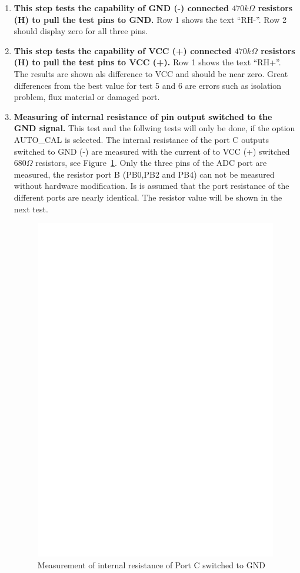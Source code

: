 \begin{enumerate}
\item {\bf This step tests the capability of GND (-) connected \(470k\Omega\) resistors (H) to pull the test pins to GND.}
Row 1 shows the text  ``RH-''.
Row 2 should display zero for all three pins.

\item {\bf This step tests the capability of VCC (+) connected \(470k\Omega\) resistors (H) to pull the test pins  to VCC (+).}
Row 1 shows the text ``RH+''.
The results are shown als difference to VCC and should be near zero.
 Great differences from the best value for test 5 and 6 are errors  such as isolation problem, flux material or damaged port.

\item {\bf Measuring of internal resistance of pin output switched to the GND signal.}
This test and the follwing tests will only be done, if the option AUTO\_CAL is selected.
The internal resistance of the port C outputs switched to GND (-) are measured with the current
of to VCC (+) switched \(680\Omega\) resistors, see Figure~\ref{fig:test7}.
Only the three pins of the ADC port are measured, the resistor port B (PB0,PB2 and PB4) can not be measured
without hardware modification.
Is is assumed that the port resistance of the different ports are nearly identical.
The resistor value will be shown in the next test.
\begin{figure}[H]
\centering
\includegraphics[]{../FIG/Test7.eps}
\caption{Measurement of internal resistance of Port C switched to GND }
\label{fig:test7}
\end{figure}


\end{enumerate}
